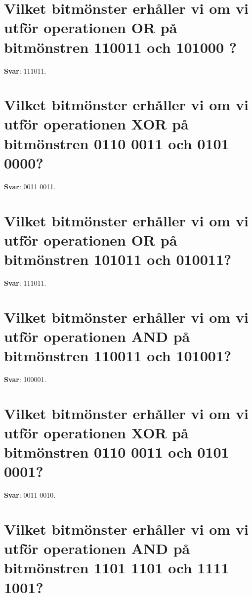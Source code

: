 \documentclass[a4paper,11pt,oneside]{book}
\begin{document}
\begin{sloppypar}
\section{Vilket bitm\"onster erh\r{a}ller vi om vi utf\"or operationen OR p\r{a} bitm\"onstren 110011 och 101000 ?}

\label{q:412:sa:sv:True}

\textbf{Svar}: 111011.



\section{Vilket bitm\"onster erh\r{a}ller vi om vi utf\"or operationen XOR p\r{a} bitm\"onstren 0110 0011 och 0101 0000?}

\label{q:413:sa:sv:True}

\textbf{Svar}: 0011 0011.



\section{Vilket bitm\"onster erh\r{a}ller vi om vi utf\"or operationen OR p\r{a} bitm\"onstren 101011 och 010011?}

\label{q:414:sa:sv:True}

\textbf{Svar}: 111011.



\section{Vilket bitm\"onster erh\r{a}ller vi om vi utf\"or operationen AND p\r{a} bitm\"onstren 110011 och 101001?}

\label{q:415:sa:sv:True}

\textbf{Svar}: 100001.



\section{Vilket bitm\"onster erh\r{a}ller vi om vi utf\"or operationen XOR p\r{a} bitm\"onstren 0110 0011 och 0101 0001?}

\label{q:416:sa:sv:True}

\textbf{Svar}: 0011 0010.



\section{Vilket bitm\"onster erh\r{a}ller vi om vi utf\"or operationen AND p\r{a} bitm\"onstren 1101 1101 och 1111 1001?}


\end{sloppypar}
\end{document}
